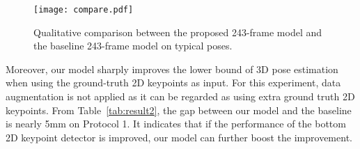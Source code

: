 \documentclass[journal]{IEEEtran}
\begin{document}
\begin{figure*}[!t]
\vspace{-1mm}
\centering
\texttt{[image: compare.pdf]}
\caption{Qualitative comparison between the proposed 243-frame model and the baseline 243-frame model \cite{pavllo20193d} on typical poses.}
\label{fig:compare}
\vspace{-1mm}
\end{figure*}

\begin{table}[htbp]

  \small\centering
  \caption{\label{tab:result2} Quantitative comparisons of models trained/evaluated on Human3.6M using the ground-truth 2D input.}
  \begin{threeparttable}
  \end{threeparttable}
  
  \vspace{-1mm}
 \end{table}

Moreover, our model sharply improves the lower bound of 3D pose estimation when using the ground-truth 2D keypoints as input. For this experiment, data augmentation is not applied as it can be regarded as using extra ground truth 2D keypoints. From Table~\ref{tab:result2}, the gap between our model and the baseline is nearly 5mm on Protocol 1. It indicates that if the performance of the bottom 2D keypoint detector is improved, our model can further boost the improvement.
\end{document}
